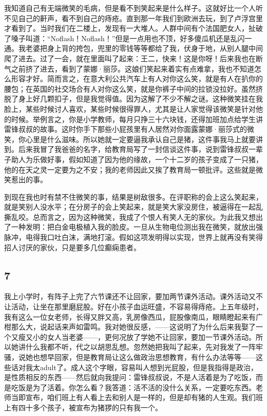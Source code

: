 我知道自己有无端微笑的毛病，但是看不到笑起来是什么样子。这就好比一个人听不见自己的鼾声，看不到自己的痔疮。直到那一年我们到欧洲去玩，到了卢浮宫里才看到了。当时我们在二楼上，发现有一大堆人。人群中间有个法国肥女人，扯破了嗓子叫道：“Noflash！Noflash！”但是一点用也不顶，好多傻瓜机还是乱闪一通。我老婆把身上背的挎包，兜里的零钱等等都给了我，伏身于地，从别人腿中间爬了进去。过了一会，就在里面叫了起来：王二，快来！这是你呀！后来我也在断气之前挤了进去，看到了蒙娜·丽莎。这娘们笑起来着实有点难拿，我也不知道怎么形容才好。简而言之，在意大利公共汽车上有人对你这么笑，就是有人在扒你的腰包；在英国的社交场合有人对你这么笑，就是你裤子中间的拉锁没拉好。虽然挤脱了身上好几颗扣子，但是我觉得值。因为这解了不少不解之谜。这种微笑挂在我脸上，某些时候讨人喜欢，某些时候很得罪人，尤其是让人家觉得该微笑是针对他的时候。举例言之，你是小学教师，每月只挣三十六块钱，还得加班加点给学生讲雷锋叔叔的故事。这时你手下那些小屁孩里有人居然对你面露蒙娜·丽莎式的微笑，你心里是什么滋味。所以她就一定要逼我承认自己是猪，这件事我马上就要讲到。后来我冒了我爸爸的名字，给教育局写了一封信谈这件事，说到雷锋叔叔一辈子助人为乐做好事，假如知道了因为他的缘故，一个十二岁的孩子变成了一只猪，他的在天之灵一定要为之不安；我的老师因此又挨了教育局一顿批评。这些就是微笑惹出的事。 

到现在我也时有禁不住微笑的事，结果是树敌很多。在评职称的会上这么笑起来，就是笑别人没水平；在分房子的会上笑起来，就是笑大家没房住，被逼得在一起乱撕乱咬。总而言之，因为这种微笑，我成了个恨人有笑人无的家伙。为此我又想出了一种发明：把白金电极植入我的脸皮。一旦从生物电位测出我在微笑，就放出强脉冲，电得我口吐白沫，满地打滚。假如这项发明得以实现，世界上就再没有笑得招人讨厌的家伙，只是要多几位癫痫患者。 

\subsection{7} 

我上小学时，有阵子上完了六节课还不让回家，要加两节课外活动。课外活动又不让活动，让坐在那里磨屁股。好在小孩子血运旺盛，不容易得痔疮。上五年级时，我有这么一位女老师，长得又胖又高，乳房像西瓜，屁股像南瓜，眼睛瞪起来有广柑那么大，说起话来声如雷鸣。我对她很反感，——这说明了为什么后来我娶了一个又瘦又小的女人当老婆——，更何况放了学她不让回家，要加一节课外活动。所以她讲什么我都不听，代之以胡思乱想。忽然她把我叫了起来，先对我发了一阵牢骚，说她也想早回家，但是教育局让这么做政治思想教育，有什么办法等等——这些话对我太adult了。成人这个字眼，容易叫人想到光屁股，但是我指得是政治，是性质相反的东西——然后就向我提问：雷锋叔叔说，不是人活着是为了吃饭，而是吃饭是为了活着。你怎么看？我答道：活不活的没什么关系，一定要吃东西。老师当即宣布，咱们班上有人看上去和别人是一样的，但是却有猪的人生观。我们班上有四十多个孩子，被宣布为猪猡的只有我一个。 

